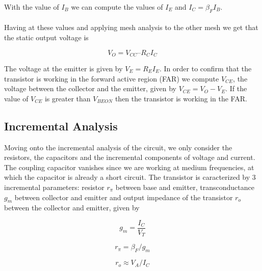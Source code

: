 With the value of $I_B$ we can compute the values of $I_E$ and $I_C = \beta_F I_B$.

\paragraph{} Having at these values and applying mesh analysis to the other mesh we get that the static output voltage is
\begin{center}
    \begin{equation}
        V_O = V_{CC} – R_C I_C
    \end{equation}
\end{center}

The voltage at the emitter is given by $V_E = R_E I_E$. In order to confirm that the transistor is working in the forward active region (FAR) we compute $V_{CE}$, the voltage between the collector and the emitter, given by $V_{CE} = V_O - V_E$. If the value of $V_{CE}$ is greater than $V_{BEON}$ then the transistor is working in the FAR.


\subsection{Incremental Analysis}

Moving onto the incremental analysis of the circuit, we only consider the resistors, the capacitors and the incremental components of voltage and current. The coupling capacitor vanishes since we are working at medium frequencies, at which the capacitor is already a short circuit. The transistor is caracterized by 3 incremental parameters: resistor $r_\pi$ between base and emitter, transconductance $g_m$ between collector and emitter and output impedance of the transistor $r_o$ between the collector and emitter, given by

\begin{equation}
    g_m = \frac{I_C}{ V_T}
\end{equation}

\begin{equation}
    r_\pi = \beta_F / g_m
\end{equation}

\begin{equation}
    r_o \approx V_A/I_C
\end{equation}

